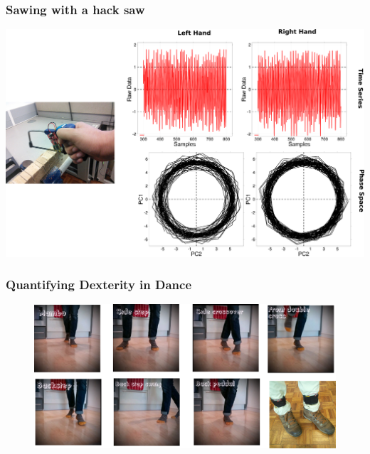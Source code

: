\documentclass{beamer}
\begin{document}
\begin{frame}
\frametitle{Sawing with a hack saw}
\vspace{-5mm}

 \includegraphics[scale=.045]{hacksaw} 

\end{frame}







\begin{frame}
\frametitle{Quantifying Dexterity in Dance}
\vspace{-0.6cm}
\begin{figure}
\includegraphics[scale=0.5]{beginner_salsa_steps_01} \\

\end{figure}  
\end{frame}
\end{document}
